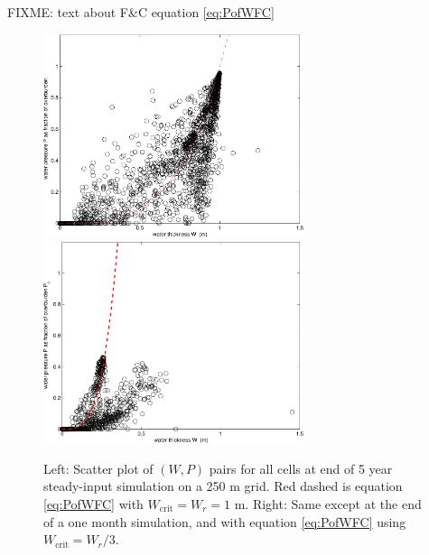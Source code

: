 \documentclass[11pt,final]{amsart}
\begin{document}

FIXME:  text about F\&C equation \eqref{eq:PofWFC}

\begin{figure}[ht]
\includegraphics[width=3.0in,keepaspectratio=true]{isPofW-250m} \,
\includegraphics[width=3.0in,keepaspectratio=true]{isPofW-250m-month}
\caption{Left: Scatter plot of $(W,P)$ pairs for all cells at end of 5 year steady-input simulation on a 250 m grid.  Red dashed is equation \eqref{eq:PofWFC} with $W_{\text{crit}} = W_r = 1$ m.  Right: Same except at the end of a one month simulation, and with equation \eqref{eq:PofWFC} using $W_{\text{crit}} = W_r / 3$.}
\label{fig:isPofWnbreen}
\end{figure}
\end{document}
